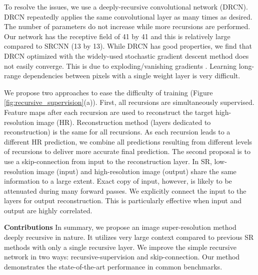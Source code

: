 \documentclass[10pt,twocolumn,letterpaper]{article}
\begin{document}


To resolve the issues, we use a deeply-recursive convolutional network (DRCN). DRCN repeatedly applies the same convolutional layer as many times as desired. The number of parameters do not increase while more recursions are performed. Our network has the receptive field of 41 by 41 and this is relatively large compared to SRCNN \cite{dong2014image} (13 by 13). While DRCN has good properties, we find that DRCN optimized with the widely-used stochastic gradient descent method does not easily converge. This is due to exploding/vanishing gradients \cite{bengio1994learning}. Learning long-range dependencies between pixels with a single weight layer is very difficult. 

We propose two approaches to ease the difficulty of training (Figure \ref{fig:recursive_supervision}(a)). First, all recursions are simultaneously supervised. Feature maps after each recursion are used to reconstruct the target high-resolution image (HR). Reconstruction method (layers dedicated to reconstruction) is the same for all recursions. As each recursion leads to a different HR prediction, we combine all predictions resulting from different levels of recursions to deliver more accurate final prediction. The second proposal is to use a skip-connection from input to the reconstruction layer. In SR, low-resolution image (input) and high-resolution image (output) share the same information to a large extent. Exact copy of input, however, is likely to be attenuated during many forward passes. We explicitly connect the input to the layers for output reconstruction. This is particularly effective when input and output are highly correlated.

\textbf{Contributions} In summary, we propose an image super-resolution method deeply recursive in nature. It utilizes very large context compared to previous SR methods with only a single recursive layer. We improve the simple recursive network in two ways: recursive-supervision and skip-connection. Our method demonstrates the state-of-the-art performance in common benchmarks.
\end{document}
